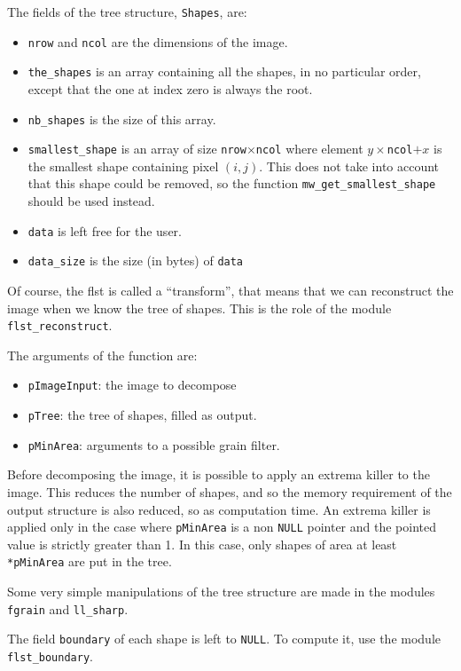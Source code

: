 The fields of the tree structure, \texttt{Shapes}, are:
\begin{itemize}
\item \texttt{nrow} and \texttt{ncol} are the dimensions of the image.
\item \texttt{the\_shapes} is an array containing all the shapes, in no
particular order, except that the one at index zero is always the root.
\item \texttt{nb\_shapes} is the size of this array.
\item \texttt{smallest\_shape} is an array of size
\texttt{nrow}$\times$\texttt{ncol} where element $y\times$\texttt{ncol}$+x$
is the smallest shape containing pixel $(i,j)$. This does not take into
account that this shape could be removed, so the function
\texttt{mw\_get\_smallest\_shape} should be used instead.
\item \texttt{data} is left free for the user.
\item \texttt{data\_size} is the size (in bytes) of \texttt{data}
\end{itemize}

Of course, the flst is called a ``transform'', that means that we can
reconstruct the image when we know the tree of shapes. This is the role of the
module \texttt{flst\_reconstruct}.

The arguments of the function are:
\begin{itemize}
\item \texttt{pImageInput}: the image to decompose
\item \texttt{pTree}: the tree of shapes, filled as output.
\item \texttt{pMinArea}: arguments to a possible grain filter.
\end{itemize}

Before decomposing the image, it is possible to apply an extrema killer to the
image. This reduces the number of shapes, and so the memory requirement of the
output structure is also reduced, so as computation time. An extrema killer is
applied only in the case where \texttt{pMinArea} is a non \texttt{NULL}
pointer and the pointed value is strictly greater than 1. In this case, only
shapes of area at least \texttt{*pMinArea} are put in the tree.

Some very simple manipulations of the tree structure are made in the modules
\texttt{fgrain} and \texttt{ll\_sharp}.

The field \texttt{boundary} of each shape is left to \texttt{NULL}. To compute
it, use the module \texttt{flst\_boundary}.

